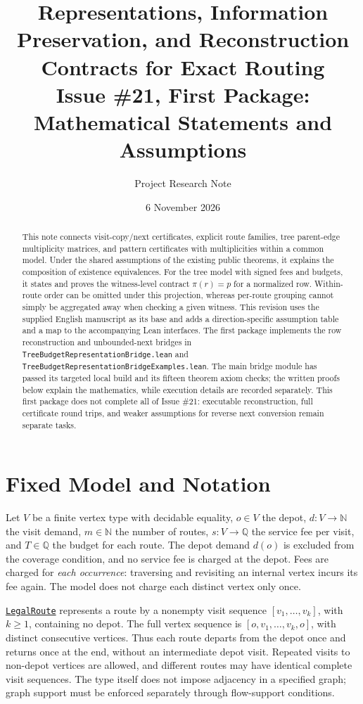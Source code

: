 \documentclass[11pt]{article}
\title{Representations, Information Preservation, and Reconstruction Contracts for Exact Routing\\
  \large Issue \#21, First Package: Mathematical Statements and Assumptions}
\author{Project Research Note}
\date{6 November 2026}
\theoremstyle{remark}
\newcommand{\N}{\mathbb N}
\newcommand{\Q}{\mathbb Q}
\newcommand{\code}[1]{\nolinkurl{#1}}
\newcommand{\src}[2]{\href{https://github.com/huam54925-cpu/uav-routing-certification/blob/1bc992475a9bd515d77245e2bc0471e5ecab2fd5/LeanCompletion/UAV/#1.lean}{#2}}
\begin{document}
\maketitle

\begin{abstract}
This note connects visit-copy/next certificates, explicit route families, tree parent-edge multiplicity matrices, and pattern certificates with multiplicities within a common model.
Under the shared assumptions of the existing public theorems, it explains the composition of existence equivalences. For the tree model with signed fees and budgets, it states and proves the witness-level contract $\pi(r)=p$ for a normalized row.
Within-route order can be omitted under this projection, whereas per-route grouping cannot simply be aggregated away when checking a given witness.
This revision uses the supplied English manuscript as its base and adds a direction-specific assumption table and a map to the accompanying Lean interfaces.
The first package implements the row reconstruction and unbounded-next bridges in \code{TreeBudgetRepresentationBridge.lean} and \code{TreeBudgetRepresentationBridgeExamples.lean}.
The main bridge module has passed its targeted local build and its fifteen theorem axiom checks; the written proofs below explain the mathematics, while execution details are recorded separately.
This first package does not complete all of Issue \#21: executable reconstruction, full certificate round trips, and weaker assumptions for reverse next conversion remain separate tasks.
\end{abstract}

\section{Fixed Model and Notation}

Let $V$ be a finite vertex type with decidable equality, $o\in V$ the depot,
$d:V\to\N$ the visit demand, $m\in\N$ the number of routes, $s:V\to\Q$ the service fee per visit,
and $T\in\Q$ the budget for each route. The depot demand $d(o)$ is excluded from the coverage condition, and no service fee is charged at the depot.
Fees are charged for \emph{each occurrence}: traversing and revisiting an internal vertex incurs its fee again.
The model does not charge each distinct vertex only once.

\src{RouteToFlow}{\code{LegalRoute}} represents a route by a nonempty visit sequence
$[v_1,\ldots,v_k]$, with $k\geq1$, containing no depot. The full vertex sequence is
$[o,v_1,\ldots,v_k,o]$, with distinct consecutive vertices. Thus each route departs from the depot once and returns once at the end,
without an intermediate depot visit. Repeated visits to non-depot vertices are allowed, and different routes may have identical complete visit sequences.
The type itself does not impose adjacency in a specified graph; graph support must be enforced separately through flow-support conditions.
\end{document}
